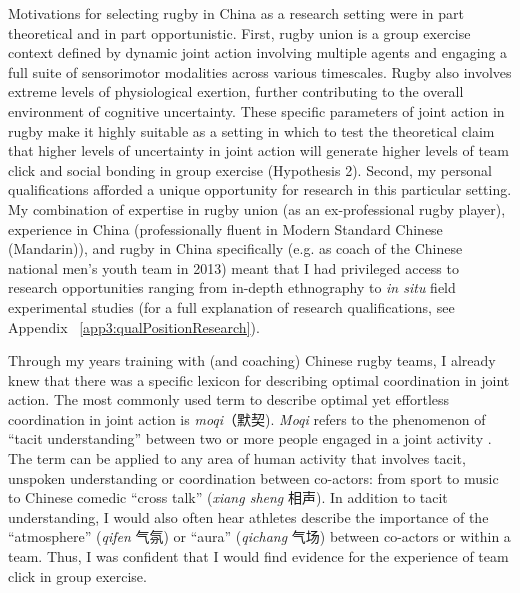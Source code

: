 \begin{CJK}{UTF8}{gbsn}
Motivations for selecting rugby in China as a research setting were in part theoretical and in part opportunistic.  First, rugby union is a group exercise context defined by dynamic joint action involving multiple agents and engaging a full suite of sensorimotor modalities across various timescales.  Rugby also involves extreme levels of physiological exertion, further contributing to the overall environment of cognitive uncertainty.  These specific parameters of joint action in rugby make it highly suitable as a setting in which to test the theoretical claim that higher levels of uncertainty in joint action will generate higher levels of team click and social bonding in group exercise (Hypothesis 2).  Second, my personal qualifications afforded a unique opportunity for research in this particular setting.  My combination of expertise in rugby union (as an ex-professional rugby player), experience in China (professionally fluent in Modern Standard Chinese (Mandarin)), and rugby in China specifically (e.g. as coach of the Chinese national men’s youth team in 2013) meant that I had privileged access to research opportunities ranging from in-depth ethnography to \textit{in situ} field experimental studies (for a full explanation of research qualifications, see Appendix ~\ref{app3:qualPositionResearch}).

Through my years training with (and coaching) Chinese rugby teams, I already knew that there was a specific lexicon for describing optimal coordination in joint action.  The most commonly used term to describe optimal yet effortless coordination in joint action is \textit{moqi}（默契).  \textit{Moqi} refers to the phenomenon of ``tacit understanding'' between two or more people engaged in a joint activity \citep{Pleco2018}. The term can be applied to any area of human activity that involves tacit, unspoken understanding or coordination between co-actors: from sport to music to Chinese comedic ``cross talk'' (\textit{xiang sheng} 相声).  In addition to tacit understanding, I would also often hear athletes describe the importance of the ``atmosphere'' (\textit{qifen} 气氛) or ``aura'' (\textit{qichang} 气场) between co-actors or within a team.  Thus, I was confident that I would find evidence for the experience of team click in group exercise.


\end{CJK}
